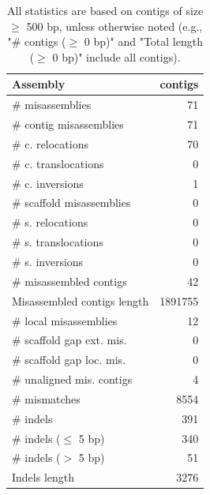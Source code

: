 \documentclass[12pt,a4paper]{article}
\begin{document}
\begin{table}[ht]
\begin{center}
\caption{All statistics are based on contigs of size $\geq$ 500 bp, unless otherwise noted (e.g., "\# contigs ($\geq$ 0 bp)" and "Total length ($\geq$ 0 bp)" include all contigs).}
\begin{tabular}{|l*{1}{|r}|}
\hline
Assembly & contigs \\ \hline
\# misassemblies & 71 \\ \hline
\hspace{2mm}\# contig misassemblies & 71 \\ \hline
\hspace{5mm}\# c. relocations & 70 \\ \hline
\hspace{5mm}\# c. translocations & 0 \\ \hline
\hspace{5mm}\# c. inversions & 1 \\ \hline
\hspace{2mm}\# scaffold misassemblies & 0 \\ \hline
\hspace{5mm}\# s. relocations & 0 \\ \hline
\hspace{5mm}\# s. translocations & 0 \\ \hline
\hspace{5mm}\# s. inversions & 0 \\ \hline
\# misassembled contigs & 42 \\ \hline
Misassembled contigs length & 1891755 \\ \hline
\# local misassemblies & 12 \\ \hline
\# scaffold gap ext. mis. & 0 \\ \hline
\# scaffold gap loc. mis. & 0 \\ \hline
\# unaligned mis. contigs & 4 \\ \hline
\# mismatches & 8554 \\ \hline
\# indels & 391 \\ \hline
\hspace{5mm}\# indels ($\leq$ 5 bp) & 340 \\ \hline
\hspace{5mm}\# indels ($>$ 5 bp) & 51 \\ \hline
Indels length & 3276 \\ \hline
\end{tabular}
\end{center}
\end{table}
\end{document}
